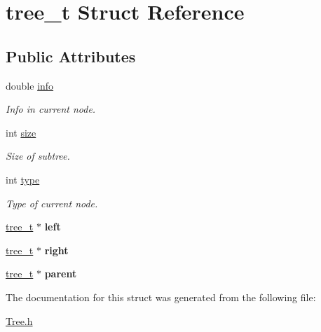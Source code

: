 \hypertarget{structtree__t}{\section{tree\-\_\-t Struct Reference}
\label{structtree__t}
}
\subsection*{Public Attributes}
\begin{DoxyCompactItemize}
\item 
\hypertarget{structtree__t_ab94d4460b40cd79ff6d4a964ba70df70}{double \hyperlink{structtree__t_ab94d4460b40cd79ff6d4a964ba70df70}{info}}\label{structtree__t_ab94d4460b40cd79ff6d4a964ba70df70}

\begin{DoxyCompactList}\small\item\em Info in current node. \end{DoxyCompactList}\item 
\hypertarget{structtree__t_a8b0e554661ab9823aac56630765019c1}{int \hyperlink{structtree__t_a8b0e554661ab9823aac56630765019c1}{size}}\label{structtree__t_a8b0e554661ab9823aac56630765019c1}

\begin{DoxyCompactList}\small\item\em Size of subtree. \end{DoxyCompactList}\item 
\hypertarget{structtree__t_a2fa29c953fb1819c0cecc27b60ad904c}{int \hyperlink{structtree__t_a2fa29c953fb1819c0cecc27b60ad904c}{type}}\label{structtree__t_a2fa29c953fb1819c0cecc27b60ad904c}

\begin{DoxyCompactList}\small\item\em Type of current node. \end{DoxyCompactList}\item 
\hypertarget{structtree__t_a75ec6d84c52b31dcde6ffb2d5e7f7f0f}{\hyperlink{structtree__t}{tree\-\_\-t} $\ast$ {\bfseries left}}\label{structtree__t_a75ec6d84c52b31dcde6ffb2d5e7f7f0f}

\item 
\hypertarget{structtree__t_a5a1b362a527c27d4d4aa3a6d19831e0f}{\hyperlink{structtree__t}{tree\-\_\-t} $\ast$ {\bfseries right}}\label{structtree__t_a5a1b362a527c27d4d4aa3a6d19831e0f}

\item 
\hypertarget{structtree__t_ac86c58737cc0a53ab35045b6f041c17e}{\hyperlink{structtree__t}{tree\-\_\-t} $\ast$ {\bfseries parent}}\label{structtree__t_ac86c58737cc0a53ab35045b6f041c17e}

\end{DoxyCompactItemize}


The documentation for this struct was generated from the following file\-:\begin{DoxyCompactItemize}
\item 
\hyperlink{Tree_8h}{Tree.\-h}\end{DoxyCompactItemize}
